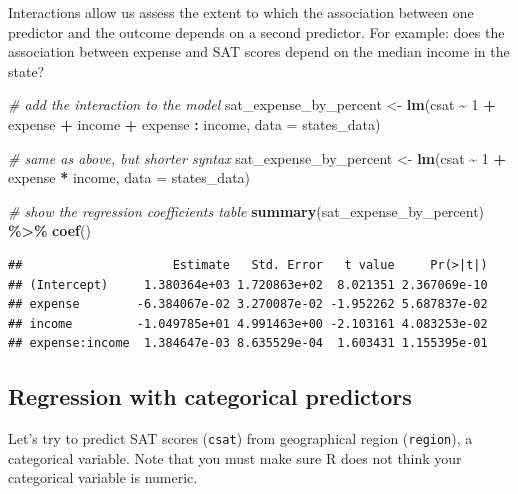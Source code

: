 \documentclass[
]{book}
\newenvironment{Shaded}{\begin{snugshade}}{\end{snugshade}}
\newcommand{\CommentTok}[1]{\textcolor[rgb]{0.56,0.35,0.01}{\textit{#1}}}
\newcommand{\DataTypeTok}[1]{\textcolor[rgb]{0.13,0.29,0.53}{#1}}
\newcommand{\DecValTok}[1]{\textcolor[rgb]{0.00,0.00,0.81}{#1}}
\newcommand{\KeywordTok}[1]{\textcolor[rgb]{0.13,0.29,0.53}{\textbf{#1}}}
\newcommand{\NormalTok}[1]{#1}
\newcommand{\OperatorTok}[1]{\textcolor[rgb]{0.81,0.36,0.00}{\textbf{#1}}}
\newcommand{\StringTok}[1]{\textcolor[rgb]{0.31,0.60,0.02}{#1}}
\begin{document}
Interactions allow us assess the extent to which the association between one predictor and the outcome depends on a second predictor. For example: does the association between expense and SAT scores depend on the median income in the state?

\begin{Shaded}
\begin{Highlighting}[]
  \CommentTok{\# add the interaction to the model}
\NormalTok{  sat\_expense\_by\_percent \textless{}{-}}\StringTok{ }\KeywordTok{lm}\NormalTok{(csat }\OperatorTok{\textasciitilde{}}\StringTok{ }\DecValTok{1} \OperatorTok{+}\StringTok{ }\NormalTok{expense }\OperatorTok{+}\StringTok{ }\NormalTok{income }\OperatorTok{+}\StringTok{ }\NormalTok{expense }\OperatorTok{:}\StringTok{ }\NormalTok{income, }\DataTypeTok{data =}\NormalTok{ states\_data)}

  \CommentTok{\# same as above, but shorter syntax}
\NormalTok{  sat\_expense\_by\_percent \textless{}{-}}\StringTok{ }\KeywordTok{lm}\NormalTok{(csat }\OperatorTok{\textasciitilde{}}\StringTok{ }\DecValTok{1} \OperatorTok{+}\StringTok{ }\NormalTok{expense }\OperatorTok{*}\StringTok{ }\NormalTok{income, }\DataTypeTok{data =}\NormalTok{ states\_data) }

  \CommentTok{\# show the regression coefficients table}
  \KeywordTok{summary}\NormalTok{(sat\_expense\_by\_percent) }\OperatorTok{\%\textgreater{}\%}\StringTok{ }\KeywordTok{coef}\NormalTok{() }
\end{Highlighting}
\end{Shaded}

\begin{verbatim}
##                     Estimate   Std. Error   t value     Pr(>|t|)
## (Intercept)     1.380364e+03 1.720863e+02  8.021351 2.367069e-10
## expense        -6.384067e-02 3.270087e-02 -1.952262 5.687837e-02
## income         -1.049785e+01 4.991463e+00 -2.103161 4.083253e-02
## expense:income  1.384647e-03 8.635529e-04  1.603431 1.155395e-01
\end{verbatim}

\hypertarget{regression-with-categorical-predictors}{%
\subsection{Regression with categorical predictors}\label{regression-with-categorical-predictors}}

Let's try to predict SAT scores (\texttt{csat}) from geographical region (\texttt{region}), a categorical variable. Note that you must make sure R does not think your categorical variable is numeric.
\end{document}
